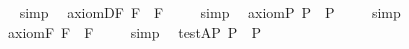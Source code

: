 \begin{isabellebody}
\isadelimproof
\ %
\endisadelimproof
%
\isatagproof
{}\isamarkupfalse%
\ simp\ \isamarkupfalse%
%
\endisatagproof
{\isafoldproof}%
%
\isadelimproof
%
\endisadelimproof
\isanewline
{}\isamarkupfalse%
\ axiom{\isacharunderscore}D{\isacharunderscore}F{\isacharcolon}\ {\isachardoublequoteopen}{\isacharbrackleft}\isactrlbold {\isasymbox}{\isacharparenleft}{\isasymphi}\isactrlsup F{\isacharparenright}\ \isactrlbold {\isasymrightarrow}\ \isactrlbold {\isasymbox}{\isacharparenleft}\isactrlbold {\isasymbox}{\isacharparenleft}{\isasymphi}\isactrlsup F{\isacharparenright}{\isacharparenright}{\isacharbrackright}\ {\isacharequal}\ {\isasymtop}{\isachardoublequoteclose}%
\isadelimproof
\ %
\endisadelimproof
%
\isatagproof
{}\isamarkupfalse%
\ simp\ \isamarkupfalse%
%
\endisatagproof
{\isafoldproof}%
%
\isadelimproof
%
\endisadelimproof
\isanewline
\isanewline
{}\isamarkupfalse%
\ axiom{\isacharunderscore}{}{\isacharunderscore}P{\isacharcolon}\ {\isachardoublequoteopen}{\isacharbrackleft}\isactrlbold {\isasymdiamond}{\isacharparenleft}{\isasymphi}\isactrlsup P{\isacharparenright}\ \isactrlbold {\isasymrightarrow}\ \isactrlbold {\isasymbox}{\isacharparenleft}\isactrlbold {\isasymdiamond}{\isacharparenleft}{\isasymphi}\isactrlsup P{\isacharparenright}{\isacharparenright}{\isacharbrackright}\ {\isacharequal}\ {\isasymtop}{\isachardoublequoteclose}%
\isadelimproof
\ %
\endisadelimproof
%
\isatagproof
{}\isamarkupfalse%
\ simp\ \isamarkupfalse%
%
\endisatagproof
{\isafoldproof}%
%
\isadelimproof
%
\endisadelimproof
\isanewline
{}\isamarkupfalse%
\ axiom{\isacharunderscore}{}{\isacharunderscore}F{\isacharcolon}\ {\isachardoublequoteopen}{\isacharbrackleft}\isactrlbold {\isasymdiamond}{\isacharparenleft}{\isasymphi}\isactrlsup F{\isacharparenright}\ \isactrlbold {\isasymrightarrow}\ \isactrlbold {\isasymbox}{\isacharparenleft}\isactrlbold {\isasymdiamond}{\isacharparenleft}{\isasymphi}\isactrlsup F{\isacharparenright}{\isacharparenright}{\isacharbrackright}\ {\isacharequal}\ {\isasymtop}{\isachardoublequoteclose}%
\isadelimproof
\ %
\endisadelimproof
%
\isatagproof
{}\isamarkupfalse%
\ simp\ \isamarkupfalse%
%
\endisatagproof
{\isafoldproof}%
%
\isadelimproof
%
\endisadelimproof
\isanewline
\isanewline
{}\isamarkupfalse%
\ test{\isacharunderscore}A{\isacharunderscore}P{\isacharcolon}\ {\isachardoublequoteopen}{\isacharbrackleft}\isactrlbold {\isasymbox}{\isacharparenleft}\isactrlbold {\isasymdiamond}{\isacharparenleft}{\isasymphi}\isactrlsup P{\isacharparenright}{\isacharparenright}\ \isactrlbold {\isasymrightarrow}\ \isactrlbold {\isasymdiamond}{\isacharparenleft}{\isasymphi}\isactrlsup P{\isacharparenright}{\isacharbrackright}\ {\isacharequal}\ {\isasymtop}{\isachardoublequoteclose}%

\end{isabellebody}
